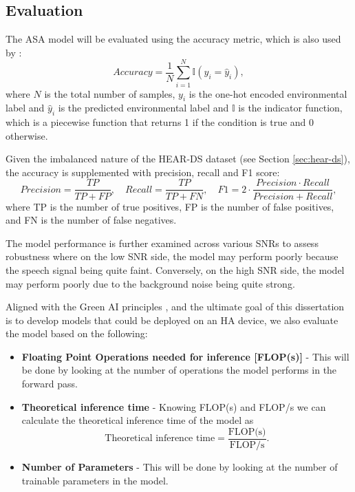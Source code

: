 \documentclass[logo,bsc,singlespacing,parskip,online]{infthesis}
\begin{document}
\subsection{Evaluation}
The ASA model will be evaluated using the accuracy metric, which is also used by \citet{Huwel2020HearDS}:
\[
Accuracy = \frac{1}{N} \sum_{i=1}^{N} \mathbb{I}(y_i = \hat{y}_i),
\]
where \(N\) is the total number of samples, \(y_i\) is the one-hot encoded environmental label and \(\hat{y}_i\) is the predicted environmental label
and \(\mathbb{I}\) is the indicator function, which is a piecewise function that returns 1 if the condition is true and 0 otherwise.

Given the imbalanced nature of the HEAR-DS dataset (see Section \ref{sec:hear-ds}),
the accuracy is supplemented with precision, recall and F1 score:
\[
Precision = \frac{TP}{TP + FP}, \quad Recall = \frac{TP}{TP + FN}, \quad F1 = 2 \cdot \frac{Precision \cdot Recall}{Precision + Recall},
\]
where TP is the number of true positives, FP is the number of false positives, and FN is the number of false negatives.

The model performance is further examined across various SNRs to assess robustness
where on the low SNR side, the model may perform poorly because the speech signal being quite faint. 
Conversely, on the high SNR side, the model may perform poorly due to the background noise being quite strong. 


Aligned with the Green AI principles \citep{schwartz2019greenai}, and the ultimate goal of this 
dissertation is to develop models that could be deployed on an HA device, we also evaluate the model 
based on the following: 
\begin{itemize}
   \item \textbf{Floating Point Operations needed for inference [FLOP(s)]} - This will be done by looking at the number of operations the model performs in the forward pass.
   \item \textbf{Theoretical inference time} - Knowing FLOP(s) and FLOP/s we can calculate the theoretical inference time of the model as 
   \begin{equation}
   \text{Theoretical inference time} = \frac{\text{FLOP(s)}}{\text{FLOP/s}}.
   \label{eq:inference-time}
   \end{equation}
   \item \textbf{Number of Parameters} - This will be done by looking at the number of trainable parameters in the model.
\end{itemize}
\end{document}
